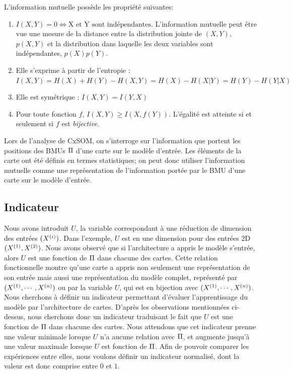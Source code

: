 L'information mutuelle possède les propriété suivantes:
\begin{enumerate}
\item $I(X,Y) = 0 \Leftrightarrow \textrm{X et Y sont indépendantes}$. L'information mutuelle peut être vue une mesure de la distance entre la distribution jointe de $(X,Y)$, $p(X,Y)$ et la distribution dans laquelle les deux variables sont indépendantes, $p(X)p(Y)$.
\item Elle s'exprime à partir de l'entropie : $I(X,Y) = H(X) + H(Y) - H(X,Y) = H(X) - H(X|Y) = H(Y) - H(Y|X)$
\item Elle est symétrique : $I(X,Y) = I(Y,X)$
\item Pour toute fonction $f$, $I(X,Y) \geq I(X,f(Y))$. L'égalité est atteinte si et seulement si $f$ est \emph{bijective}.
\end{enumerate}

Lors de l'analyse de CxSOM, on s'interroge sur l'information que portent les positions des BMUs $\Pi$ d'une carte sur le modèle d'entrée. Les éléments de la carte ont été définis en termes statistiques; on peut donc utiliser l'information mutuelle comme une représentation de l'information portée par le BMU d'une carte sur le modèle d'entrée.
\subsection{Indicateur}

Nous avons introduit $U$, la variable correspondant à une réduction de dimension des entrées $(X^{({i})})$. Dans l'exemple, $U$ est en une dimension pour des entrées 2D $(X^{({1})},X^{({2})})$.
Nous avons observé que si l'architecture a appris le modèle s'entrée, alors $U$ est une fonction de $\Pi$ dans chacune des cartes.
Cette relation fonctionnelle montre qu'une carte a appris non seulement une représentation de son entrée mais aussi une représentation du modèle complet, représenté par $(X^{({1})},\cdots,X^{({n})})$ ou par la variable $U$, qui est en bijection avec $(X^{({1})},\cdots,X^{({n})})$.
Nous cherchons à définir un indicateur permettant d'évaluer l'apprentissage du modèle par l'architecture de cartes. D'après les observations mentionnées ci-dessus, nous cherchons donc un indicateur traduisant le fait que $U$ est une fonction de $\Pi$ dans chacune des cartes. Nous attendons que cet indicateur prenne une valeur minimale lorsque $U$ n'a aucune relation avec $\Pi$, et augmente jusqu'à une valeur maximale lorsque $U$ est fonction de $\Pi$. Afin de pouvoir comparer les expériences entre elles, nous voulons définir un indicateur normalisé, dont la valeur est donc comprise entre $0$ et $1$.


